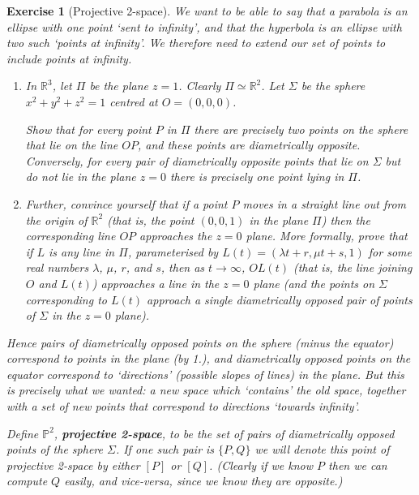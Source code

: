 \documentclass[a4paper,leqno,10pt]{article}
\theoremstyle{exercise}
\newtheorem{Exercise}{Exercise}
\newenvironment{exercise}
  {\begin{mdframed}\begin{Exercise}}
  {\end{Exercise}\end{mdframed}}
\theoremstyle{plain}
\theoremstyle{definition}
\theoremstyle{remark}
\newcommand{\df}{\textbf}
\begin{document}
\begin{exercise}[Projective 2-space]
  We want to be able to say that a parabola is an ellipse with one point `sent to infinity', and that the hyperbola is an ellipse
  with two such `points at infinity'. We therefore need to extend our set of points to include points at infinity.

  \begin{enumerate}
    \item In $\mathbb{R}^3 $, let $ \Pi $ be the \emph{plane} $ z = 1 $. Clearly $ \Pi \simeq \mathbb{R}^2 $. Let $ \Sigma $ be the
          sphere $ x^2 + y^2 + z^2 = 1 $ centred at $ O = (0,0,0) $.

          Show that for every point $ P $ in $ \Pi $ there are precisely two points on the sphere that lie on the line $ OP $, and these
          points are diametrically opposite. Conversely, for every pair of diametrically opposite points that lie on $ \Sigma $ \emph{but
          do not lie in the plane $ z = 0 $} there is precisely one point lying in $ \Pi $.

    \item Further, convince yourself that if a point $ P $ moves in a straight line out from the origin of $ \mathbb{R}^2 $ (that is, the point $ (0,0,1) $ in
          the plane $ \Pi $) then the corresponding line $ OP $ approaches the $ z = 0 $ plane. More formally, prove that
          if $ L $ is any line in $ \Pi $, parameterised by $ L(t) = (\lambda t + r, \mu t + s, 1) $ for some real
          numbers $ \lambda $, $ \mu $, $ r $, and $ s $, then as $ t \to \infty $, $ OL(t) $ (that is, the line joining $ O $ and $ L(t) $)
          approaches a line in the $ z = 0 $ plane (and the points on $ \Sigma $ corresponding to $ L(t) $ approach a single diametrically opposed pair
          of points of $ \Sigma $ in the $ z = 0 $ plane).
  \end{enumerate}

  Hence pairs of diametrically opposed points on the sphere (minus the equator) correspond to points in the plane (by 1.), and diametrically
  opposed points on the equator correspond to `directions' (possible slopes of lines) in the plane. But this is precisely what we wanted: a
  new space which `contains' the old space, together with a set of new points that correspond to directions `towards infinity'.

  Define $ \mathbb{P}^2 $, \df{projective 2-space}, to be the set of pairs of diametrically opposed points of the sphere $ \Sigma $. If
  one such pair is $ \{P,Q\} $ we will denote this point of projective 2-space by either $ [P] $ or $ [Q] $. (Clearly if we know $ P $ then
  we can compute $ Q $ easily, and vice-versa, since we know they are opposite.)


\end{exercise}
\end{document}

